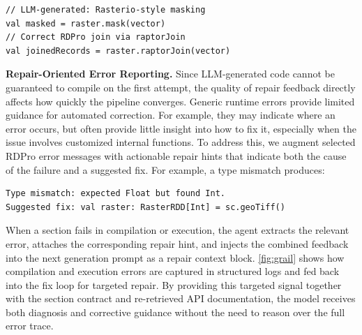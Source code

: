 
\begin{lstlisting}[style=codeStyle]
// LLM-generated: Rasterio-style masking
val masked = raster.mask(vector)
// Correct RDPro join via raptorJoin
val joinedRecords = raster.raptorJoin(vector)
\end{lstlisting}


\textbf{Repair-Oriented Error Reporting.}
Since LLM-generated code cannot be guaranteed to compile on the first attempt, the quality of repair feedback directly affects how quickly the pipeline converges. Generic runtime errors provide limited guidance for automated correction. For example, they may indicate where an error occurs, but often provide little insight into how to fix it, especially when the issue involves customized internal functions. To address this, we augment selected RDPro error messages with actionable repair hints that indicate both the cause of the failure and a suggested fix. For example, a type mismatch produces:

\begin{lstlisting}[style=codeStyle]
Type mismatch: expected Float but found Int.
Suggested fix: val raster: RasterRDD[Int] = sc.geoTiff()
\end{lstlisting}

When a section fails in compilation or execution, the agent extracts the relevant error, attaches the corresponding repair hint, and injects the combined feedback into the next generation prompt as a repair context block. \autoref{fig:grail} shows how compilation and execution errors 
are captured in structured logs and fed back into the fix loop for 
targeted repair. By providing this targeted signal together with the section contract and re-retrieved API documentation, the model receives both diagnosis and corrective guidance without the need to reason over the full error trace.